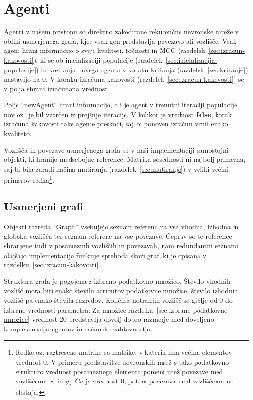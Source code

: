 \documentclass[a4paper,12pt,openright]{book}
\begin{document}
    \section{Agenti}\label{sec:agenti}
    Agenti v našem pristopu so direktno zakodirane rekurenčne nevronske mreže v obliki usmerjenega grafa, kjer vsak gen
    predstavlja povezavo ali vozlišče.
    Vsak agent hrani informacijo o svoji kvaliteti, točnosti in MCC (razdelek~\ref{sec:izracun-kakovosti}), ki se ob inicializaciji populacije (razdelek~\ref{sec:inicializacija-populacije})
    in kreiranju novega agenta v koraku križanja (razdelek~\ref{sec:krizanje}) nastavijo na 0.
    V koraku izračuna kakovosti (razdelek~\ref{sec:izracun-kakovosti}) se v polja shrani izračunana vrednost.

    Polje \enquote{newAgent} hrani informacijo, ali je agent v trenutni iteraciji populacije nov oz.\ je bil vzorčen
    iz prejšnje iteracije.
    V kolikor je vrednost \textbf{false}, korak izračuna kakovosti take agente preskoči, saj bi ponoven izračun
    vrnil enako kvaliteto.

    Vozlišča in povezave usmerjenega grafa so v naši implementaciji samostojni objekti, ki hranijo medsebojne reference.
    Matrika sosednosti ni najbolj primerna, saj bi bila zaradi načina mutiranja (razdelek~\ref{sec:mutiranje})
    v veliki večini primerov redka\footnote{Redke oz. raztresene matrike so matrike, v katerih ima večina elementov vrednost 0.
    V primeru predstavitve nevronskih mrež s tako podatkovno strukturo vrednost posameznega elementa pomeni utež povezave
    med vozliščema $x_i$ in $y_j$.
    Če je vrednost 0, potem povezava med vozliščema ne obstaja.}.

    \subsection{Usmerjeni grafi}\label{subsec:usmerjeni-grafi}
    Objekti razreda \enquote{Graph} vsebujejo seznam referenc na vsa vhodna, izhodna in globoka vozlišča ter seznam referenc
    na vse povezave.
    Čeprav so te reference shranjene tudi v posameznih vozliščih in povezavah, nam redundantni seznami olajšajo
    implementacijo funkcije sprehoda skozi graf, ki je opisana v razdelku~\ref{sec:izracun-kakovosti}.

    Struktura grafa je pogojena z izbrano podatkovno množico.
    Število vhodnih vozlišč mora biti enako številu atributov podatkovne mno\-ži\-ce, šte\-vi\-lo izhodnih vozlišč pa enako številu razredov.
    Količina notranjih vozlišč se giblje od 0 do izbrane vrednosti parametra.
    Za množice razdelka~\ref{sec:izbrane-podatkovne-mnozice} vrednost $20$ predstavlja dovolj dobro razmerje med dovoljeno kompleksnostjo agentov in
    računsko zahtevnostjo.
\end{document}
